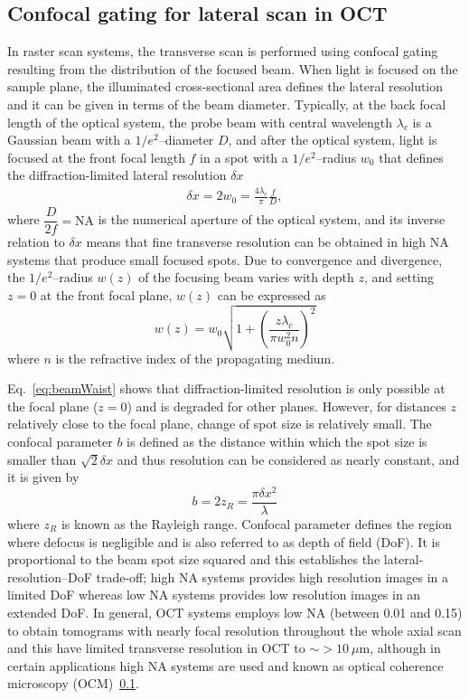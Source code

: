\subsection{Confocal gating for lateral scan in OCT}

In raster scan systems, the transverse scan is performed using confocal gating resulting from the distribution of the focused beam. When light is focused on the sample plane, the illuminated cross-sectional area defines the lateral resolution and it can be given in terms of the beam diameter. Typically, at the back focal length of the optical system, the probe beam with central wavelength $\lambda_c$ is a Gaussian beam with a $1/e^2$--diameter $D$, and after the optical system, light is focused at the front focal length $f$ in a spot with a $1/e^2$--radius $w_0$ that defines the diffraction-limited lateral resolution $\delta x$
\begin{align}
    \delta x = 2w_0 = \frac{4\lambda_c}{\pi} \frac{f}{D},
\end{align}
where $\dfrac{D}{2f} = \text{NA}$ is the numerical aperture of the optical system, and its inverse relation to $\delta x$ means that fine transverse resolution can be obtained in high NA systems that produce small focused spots. Due to convergence and divergence, the $1/e^2$--radius $w(z)$  of the focusing beam varies with depth $z$, and setting $z=0$ at the front focal plane, $w(z)$ can be expressed as
\begin{equation}\label{eq:beamWaist}
    w(z) = w_0 \sqrt{1 + \left(\frac{z\lambda_c}{\pi w_0^2n}\right)^2}
\end{equation}
where $n$ is the refractive index of the propagating medium.

Eq.~\ref{eq:beamWaist} shows that diffraction-limited resolution is only possible at the focal plane ($z=0$) and is degraded for other planes. However, for distances $z$ relatively close to the focal plane, change of spot size is relatively small. The confocal parameter $b$ is defined as the distance within which the spot size is smaller than $\sqrt{2}\delta x$ and thus resolution can be considered as nearly constant, and it is given by
\begin{equation}
    b = 2z_R = \frac{\pi\delta x^2}{\lambda}
\end{equation}
where $z_R$ is known as the Rayleigh range. Confocal parameter defines the region where defocus is negligible and is also referred to as depth of field (DoF). It is proportional to the beam spot size squared and this establishes the lateral-resolution--DoF trade-off; high NA systems provides high resolution images in a limited DoF whereas low NA systems provides low resolution images in an extended DoF. In general, OCT systems employs low NA (between 0.01 and 0.15) to obtain tomograms with nearly focal resolution throughout the whole axial scan and this have limited transverse resolution in OCT to $\sim>10~\mu$m, although in certain applications high NA systems are used and known as optical coherence microscopy (OCM)~\ref{}.


